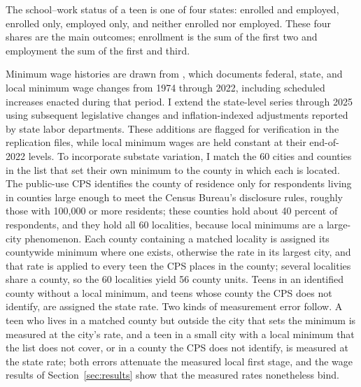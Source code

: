\documentclass[12pt]{article}
\begin{document}
The school--work status of a teen is one of four states: enrolled and employed, enrolled only, employed only, and neither enrolled nor employed. These four shares are the main outcomes; enrollment is the sum of the first two and employment the sum of the first and third.

Minimum wage histories are drawn from \citet{vaghul2016}, which documents federal, state, and local minimum wage changes from 1974 through 2022, including scheduled increases enacted during that period. I extend the state-level series through 2025 using subsequent legislative changes and inflation-indexed adjustments reported by state labor departments. These additions are flagged for verification in the replication files, while local minimum wages are held constant at their end-of-2022 levels. To incorporate substate variation, I match the 60 cities and counties in the list that set their own minimum to the county in which each is located. The public-use CPS identifies the county of residence only for respondents living in counties large enough to meet the Census Bureau's disclosure rules, roughly those with 100,000 or more residents; these counties hold about 40 percent of respondents, and they hold all 60 localities, because local minimums are a large-city phenomenon. Each county containing a matched locality is assigned its countywide minimum where one exists, otherwise the rate in its largest city, and that rate is applied to every teen the CPS places in the county; several localities share a county, so the 60 localities yield 56 county units. Teens in an identified county without a local minimum, and teens whose county the CPS does not identify, are assigned the state rate. Two kinds of measurement error follow. A teen who lives in a matched county but outside the city that sets the minimum is measured at the city's rate, and a teen in a small city with a local minimum that the list does not cover, or in a county the CPS does not identify, is measured at the state rate; both errors attenuate the measured local first stage, and the wage results of Section~\ref{sec:results} show that the measured rates nonetheless bind.
\end{document}
